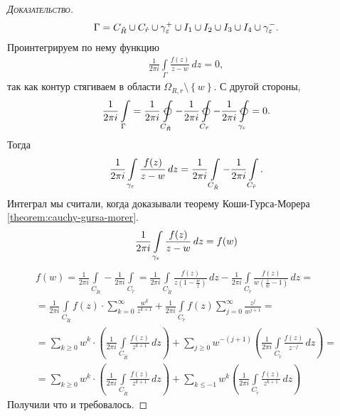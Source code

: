 \documentclass[../complex-analysis.tex]{subfiles}
\begin{document}
\begin{proof}[\normalfont\textsc{Доказательство}]
 \begin{align*}
  \Gamma = C_{\tilde R} \cup C_{\tilde r} \cup \gamma_\varepsilon^{+} \cup I_1 \cup I_2 \cup I_3 \cup I_4 \cup \gamma_\varepsilon^{-}.
 \end{align*} Проинтегрируем по нему функцию
 \begin{align*}
  \frac{1}{2\pi i} \int\limits_{\Gamma} \frac{f(z)}{z - w}  \, dz = 0,
 \end{align*} так как контур стягиваем в области $ \Omega_{R,r} \setminus \left\{ w \right\} $. С другой стороны,
 \begin{align*}
  \frac{1}{2\pi i} \int\limits_{\Gamma} = \frac{1}{2\pi i} \varointctrclockwise \limits_{C_{\tilde R}}   - \frac{1}{2\pi i} \varointctrclockwise\limits_{C_{\tilde r}}  - \frac{1}{2\pi i} \varointctrclockwise\limits_{\gamma_\eps}   = 0.
 \end{align*} Тогда
 \begin{align*}
  \frac{1}{2\pi i} \int\limits_{\gamma_\varepsilon} \frac{f(z)}{z-w}\,dz = \frac{1}{2\pi i} \int\limits_{C_{\tilde R}}   - \frac{1}{2\pi i}\int\limits_{C_{\tilde r}}.
\end{align*} Интеграл мы считали, когда доказывали теорему Коши-Гурса-Морера \eqref{theorem:cauchy-gursa-morer}.
 \begin{align*}
  \frac{1}{2\pi i} \int\limits_{\gamma_\varepsilon}   \frac{f(z)}{z-w}\,dz = f(w)
 \end{align*}
 \begin{align*}
  f(w) = \frac{1}{2\pi i} \int\limits_{C_{\tilde R}}   - \frac{1}{2\pi i} \int\limits_{C_{\tilde r}}  = \frac{1}{2\pi i} \int\limits_{C_{\tilde R}}   \frac{f(z)}{z(1 - \frac{w}{z})}\,dz - \frac{1}{2\pi i} \int\limits_{C_{\tilde r}}   \frac{f(z)}{w(\frac{z}{w}-1)}\,dz = \\
  = \frac{1}{2\pi i}  \int\limits_{C_{\tilde R}} f(z) \cdot \sum_{k=0}^{\infty} \frac{w^{k}}{z^{k+1}}   + \frac{1}{2\pi i} \int\limits_{C_{\tilde r}}  f(z) \sum_{j=0}^{\infty}\frac{z^{j}}{w^{j+1}} = \\
  = \sum_{k \geqslant 0} w^{k} \cdot \left(\frac{1}{2\pi i} \int\limits_{C_{\tilde R}}   \frac{f(z)}{z^{k+1}}\,dz \right) + \sum_{j \geqslant 0} w^{-(j+1)} \left( \frac{1}{2\pi i} \int\limits_{C_{\tilde r}} \frac{f(z)}{z^{-j}}\,dz   \right) = \\
  = \sum_{k \geqslant 0} w^{k} \cdot \left(\frac{1}{2\pi i} \int\limits_{C_{\tilde R}}   \frac{f(z)}{z^{k+1}}\,dz \right) + \sum_{k \leqslant -1} w^{k} \left( \frac{1}{2\pi i} \int\limits_{C_{\tilde r}} \frac{f(z)}{z^{k + 1}}\,dz   \right)
 \end{align*} Получили что и требовалось.


\end{proof}
\end{document}
